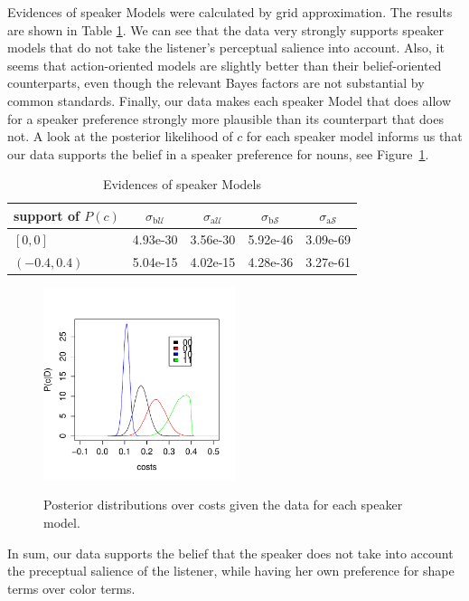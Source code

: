 Evidences of speaker Models were calculated by grid approximation. The
results are shown in Table \ref{table:speaker mod}. We can see
 that the data very strongly supports
speaker models that do not take the listener's perceptual salience
into account. Also, it seems that action-oriented models are slightly
better than their belief-oriented counterparts, even though the
relevant Bayes factors are not substantial by common
standards. Finally, our data makes each speaker Model that does allow
for a speaker preference strongly more plausible than its counterpart
that does not. A look at the posterior likelihood of $c$ for each
speaker model informs us that our data supports the belief in a
speaker preference for nouns, see
Figure~\ref{fig:cost_post_s}. 
%
\begin{table}[htb] 
  \centering 
  \caption{Evidences of speaker Models}
  \begin{tabular}{lcccc}
    support of $P(c)$ 
    & $\sigma_{\mathrm{b}\mathcal{U}}$
    & $\sigma_{\mathrm{a}\mathcal{U}}$
    & $\sigma_{\mathrm{b}\mathcal{S}}$
    & $\sigma_{\mathrm{a}\mathcal{S}}$
    \\ \midrule
    $[0,0]$
    & 4.93e-30
    & 3.56e-30
    & 5.92e-46
    & 3.09e-69
    \\
    $(-0.4,0.4)$
    & 5.04e-15
    & 4.02e-15
    & 4.28e-36
    & 3.27e-61
  \end{tabular} 
  \label{table:speaker mod}
\end{table}
%
\begin{figure}[htb]
  \centering
  \caption{Posterior distributions over costs given the data for each
    speaker model.}
  \includegraphics[width=0.5\textwidth]{pics/cost_post_s.pdf}
  \label{fig:cost_post_s}
\end{figure}
%
In sum, our data supports the belief that the speaker does not take
into account the preceptual salience of the listener, while having her
own preference for shape terms over color terms.


